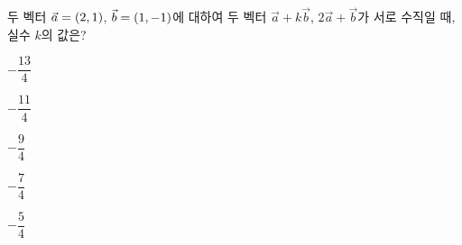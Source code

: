 두 벡터 $\vec{a}=(2{,}\mkern3mu\mathopen{}1)$, $\vec{b}=(1{,}\mkern3mu\mathopen{}-1)$에 대하여 두 벡터 $\vec{a}+k\vec{b}$, $2\vec{a}+\vec{b}$가 서로 수직일 때, 실수 $k$의 값은?
\begin{choices32}{\rule[-3ex]{0pt}{8ex}$-\dfrac{13}{4}$}{\rule[-3ex]{0pt}{8ex}$-\dfrac{11}{4}$}{\rule[-3ex]{0pt}{8ex}$-\dfrac{9}{4}$}{\rule[-3ex]{0pt}{8ex}$-\dfrac{7}{4}$}{\rule[-3ex]{0pt}{8ex}$-\dfrac{5}{4}$}\end{choices32}
